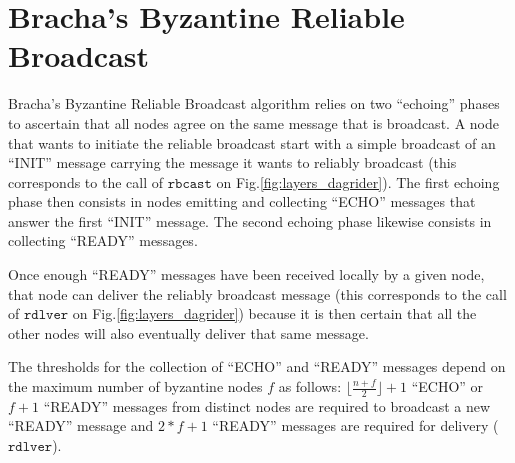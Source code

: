 

\section{Bracha's Byzantine Reliable Broadcast\label{anx:bracha}}

Bracha's Byzantine Reliable Broadcast algorithm \cite{asynchronous_byzantine_agreement_protocols} relies on two ``echoing'' phases to ascertain that all nodes agree on the same message that is broadcast.
A node that wants to initiate the reliable broadcast start with a simple broadcast of an ``INIT'' message carrying the message it wants to reliably broadcast (this corresponds to the call of $\mathtt{rbcast}$ on Fig.\ref{fig:layers_dagrider}).
The first echoing phase then consists in nodes emitting and collecting ``ECHO'' messages that answer the first ``INIT'' message.
The second echoing phase likewise consists in collecting ``READY'' messages.

Once enough ``READY'' messages have been received locally by a given node, that node can deliver the reliably broadcast message (this corresponds to the call of $\mathtt{rdlver}$ on Fig.\ref{fig:layers_dagrider}) because it is then certain that all the other nodes will also eventually deliver that same message.

The thresholds for the collection of ``ECHO'' and ``READY'' messages depend on the maximum number of byzantine nodes $f$ as follows: $\lfloor \frac{n+f}{2} \rfloor + 1$ ``ECHO'' or $f+1$ ``READY'' messages from distinct nodes are required to broadcast a new ``READY'' message and $2*f + 1$ ``READY'' messages are required for delivery ($\mathtt{rdlver}$).


